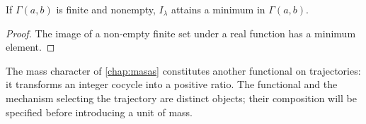 \begin{proposition}
If \(\Gamma(a,b)\) is finite and nonempty, \(I_\lambda\) attains a minimum in
\(\Gamma(a,b)\).
\end{proposition}
\begin{proof}
The image of a non-empty finite set under a real function has a minimum element.
\end{proof}

The mass character of \cref{chap:masas} constitutes another functional on
trajectories: it transforms an integer cocycle into a positive ratio. The
functional and the mechanism selecting the trajectory are distinct objects;
their composition will be specified before introducing a unit of
mass.
